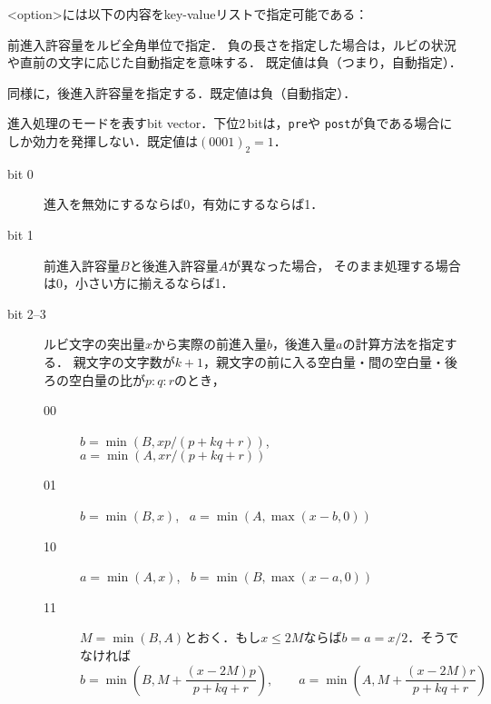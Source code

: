 \documentclass[a4paper,10pt]{ltjsarticle}
\begin{document}
<option>には以下の内容をkey-valueリストで指定可能である：
\begin{description}
\def\makelabel#1{\ttfamily\bfseries #1}
\item[pre=<real>] 前進入許容量をルビ全角単位で指定．
負の長さを指定した場合は，ルビの状況や直前の文字に応じた自動指定を意味する．
既定値は負（つまり，自動指定）．

\item[post=<real>] 同様に，後進入許容量を指定する．既定値は負（自動指定）．

\item[mode] 進入処理のモードを表すbit vector．下位2\,bitは，\texttt{pre}や
\texttt{post}が負である場合にしか効力を発揮しない．既定値は$(0001)_2 = 1$．
\begin{description}
 \item[bit 0] 進入を無効にするならば0，有効にするならば1．
 \item[bit 1] 前進入許容量$B$と後進入許容量$A$が異なった場合，
そのまま処理する場合は0，小さい方に揃えるならば1．
 \item[bit 2--3] ルビ文字の突出量$x$から実際の前進入量$b$，後進入量$a$の計算方法を指定する．
親文字の文字数が$k+1$，親文字の前に入る空白量・間の空白量・後ろの空白量の比が$p:q:r$のとき，
\begin{description}
 \item[00] $b=\min(B, xp/(p+kq+r))$, \ $a=\min(A, xr/(p+kq+r))$
 \item[01] $b=\min(B, x)$, \ $a=\min(A, \max(x-b,0))$
 \item[10] $a=\min(A, x)$, \ $b=\min(B, \max(x-a,0))$
 \item[11] $M=\min(B,A)$とおく．もし$x\le 2M$ならば$b=a=x/2$．そうでなければ
\[
 b=\min\left(B, M + \frac{(x-2M)p}{p+kq+r}\right),\qquad 
 a=\min\left(A, M + \frac{(x-2M)r}{p+kq+r}\right)
\]
\end{description}


\end{description}
\end{description}
\end{document}
